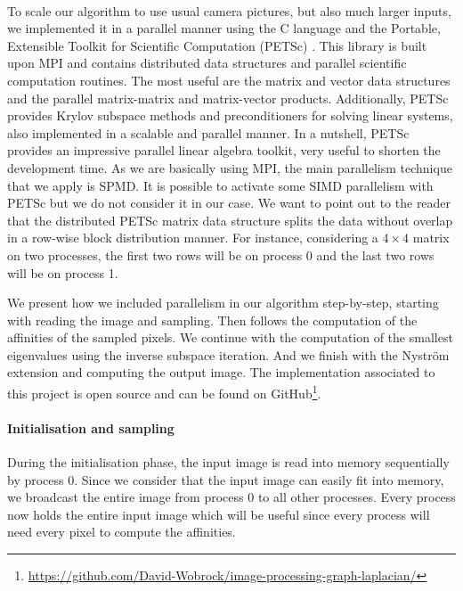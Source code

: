 \paragraph{}
To scale our algorithm to use usual camera pictures, but also much larger inputs, we implemented it in a parallel manner using the C language and the Portable, Extensible Toolkit for Scientific Computation (PETSc) \cite{petsc_web_page}.
This library is built upon MPI and contains distributed data structures and parallel scientific computation routines.
The most useful are the matrix and vector data structures and the parallel matrix-matrix and matrix-vector products.
Additionally, PETSc provides Krylov subspace methods and preconditioners for solving linear systems, also implemented in a scalable and parallel manner.
In a nutshell, PETSc provides an impressive parallel linear algebra toolkit, very useful to shorten the development time.
As we are basically using MPI, the main parallelism technique that we apply is SPMD.
It is possible to activate some SIMD parallelism with PETSc but we do not consider it in our case.
We want to point out to the reader that the distributed PETSc matrix data structure splits the data without overlap in a row-wise block distribution manner.
For instance, considering a \(4 \times 4\) matrix on two processes, the first two rows will be on process 0 and the last two rows will be on process 1.

We present how we included parallelism in our algorithm step-by-step, starting with reading the image and sampling.
Then follows the computation of the affinities of the sampled pixels.
We continue with the computation of the smallest eigenvalues using the inverse subspace iteration.
And we finish with the Nystr\"om extension and computing the output image.
The implementation associated to this project is open source and can be found on GitHub\footnote{\url{https://github.com/David-Wobrock/image-processing-graph-laplacian/}}.

\paragraph{Initialisation and sampling}
During the initialisation phase, the input image is read into memory sequentially by process 0.
Since we consider that the input image can easily fit into memory, we broadcast the entire image from process 0 to all other processes.
Every process now holds the entire input image which will be useful since every process will need every pixel to compute the affinities.

